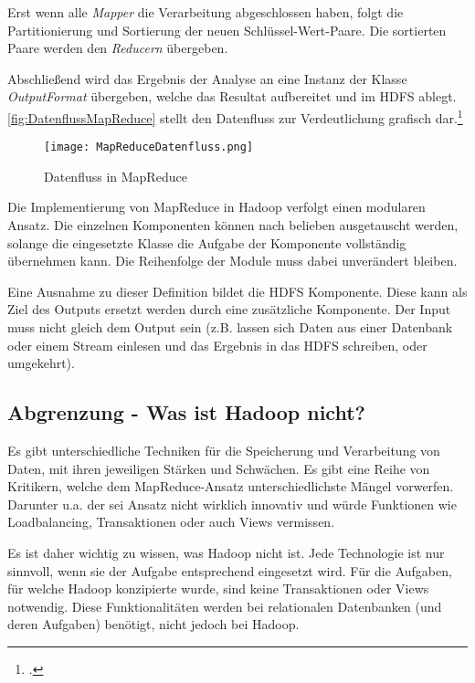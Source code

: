 Erst wenn alle \textit{Mapper} die Verarbeitung abgeschlossen haben, folgt die Partitionierung und Sortierung der neuen Schlüssel-Wert-Paare. Die sortierten Paare werden den \textit{Reducern} übergeben.

Abschließend wird das Ergebnis der Analyse an eine Instanz der Klasse \textit{OutputFormat} übergeben, welche das Resultat aufbereitet und im \ac{HDFS} ablegt. \autoref{fig:DatenflussMapReduce} stellt den Datenfluss zur Verdeutlichung grafisch dar.\footcite[Vgl.][S. 110-113]{Freiknecht.2014}

\begin{figure}[h]
	\centering
	\texttt{[image: MapReduceDatenfluss.png]}
	\caption{Datenfluss in MapReduce\footnotemark}
	\label{fig:DatenflussMapReduce}
\end{figure}

Die Implementierung von MapReduce in Hadoop verfolgt einen modularen Ansatz. Die einzelnen Komponenten können nach belieben ausgetauscht werden, solange die eingesetzte Klasse die Aufgabe der Komponente vollständig übernehmen kann. Die Reihenfolge der Module muss dabei unverändert bleiben.

Eine Ausnahme zu dieser Definition bildet die \ac{HDFS} Komponente. Diese kann als Ziel des Outputs ersetzt werden durch eine zusätzliche Komponente. Der Input muss nicht gleich dem Output sein (z.B. lassen sich Daten aus einer Datenbank oder einem Stream einlesen und das Ergebnis in das \ac{HDFS} schreiben, oder umgekehrt).

\subsection{Abgrenzung - Was ist Hadoop nicht?}
Es gibt unterschiedliche Techniken für die Speicherung und Verarbeitung von Daten, mit ihren jeweiligen Stärken und Schwächen. Es gibt eine Reihe von Kritikern, welche dem MapReduce-Ansatz unterschiedlichste Mängel vorwerfen. Darunter u.a. der sei Ansatz nicht wirklich innovativ und würde Funktionen wie Loadbalancing, Transaktionen oder auch Views vermissen.

Es ist daher wichtig zu wissen, was Hadoop nicht ist. Jede Technologie ist nur sinnvoll, wenn sie der Aufgabe entsprechend eingesetzt wird. Für die Aufgaben, für welche Hadoop konzipierte wurde, sind keine Transaktionen oder Views notwendig. Diese Funktionalitäten werden bei relationalen Datenbanken (und deren Aufgaben) benötigt, nicht jedoch bei Hadoop.


